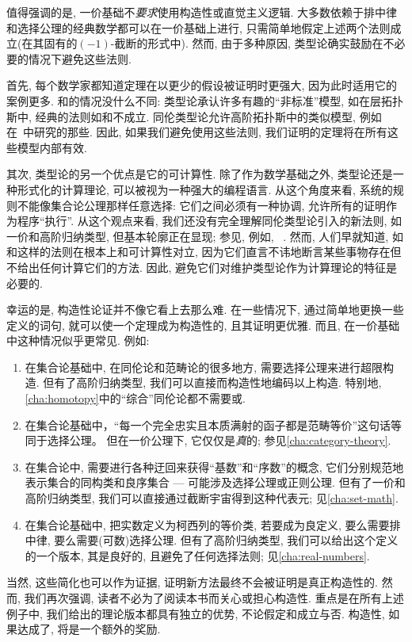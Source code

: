 值得强调的是, 一价基础不\emph{要求}使用构造性或直觉主义逻辑.  %
大多数依赖于排中律和选择公理的经典数学都可以在一价基础上进行, 只需简单地假定上述两个法则成立(在其固有的$(-1)$-截断的形式中). 
然而, 由于多种原因, 类型论确实鼓励在不必要的情况下避免这些法则. 

首先, 每个数学家都知道定理在以更少的假设被证明时更强大, 因为此时适用它的案例更多.
\choice{}和\LEM{}的情况没什么不同:
类型论承认许多有趣的``非标准''模型, 如在层拓扑斯中, 经典的法则如\choice{}和\LEM{}不成立.  
同伦类型论允许高阶拓扑斯中的类似模型, 例如在~\cite{ToenVezzosi02,Rezk05,lurie:higher-topoi}中研究的那些. 
因此, 如果我们避免使用这些法则, 我们证明的定理将在所有这些模型内部有效. 

其次, 类型论的另一个优点是它的可计算性. 
除了作为数学基础之外, 类型论还是一种形式化的计算理论, 可以被视为一种强大的编程语言. 
%
从这个角度来看, 系统的规则不能像集合论公理那样任意选择: 它们之间必须有一种协调, 允许所有的证明作为程序``执行''. 
从这个观点来看, 我们还没有完全理解同伦类型论引入的新法则, 如一价和高阶归纳类型, 但基本轮廓正在显现; 参见, 例如, ~\cite{lh:canonicity}.
然而, 人们早就知道, 如\choice{}和\LEM{}这样的法则在根本上和可计算性对立, 因为它们直言不讳地断言某些事物存在但不给出任何计算它们的方法. 
因此, 避免它们对维护类型论作为计算理论的特征是必要的. 

幸运的是, 构造性论证并不像它看上去那么难. 
在一些情况下, 通过简单地更换一些定义的词句, 就可以使一个定理成为构造性的, 且其证明更优雅. 
而且, 在一价基础中这种情况似乎更常见. 
例如: 
\begin{enumerate}
\item 在集合论基础中, 在同伦论和范畴论的很多地方, 需要选择公理来进行超限构造. 
      但有了高阶归纳类型, 我们可以直接而构造性地编码以上构造.
      特别地, \cref{cha:homotopy}中的``综合''同伦论都不需要\LEM{}或\choice{}.
\item 在集合论基础中，“每一个完全忠实且本质满射的函子都是范畴等价”这句话等同于选择公理。
      但在一价公理下, 它仅仅是\emph{真}的; 参见\cref{cha:category-theory}.
\item 在集合论中, 需要进行各种迂回来获得``基数''和``序数''的概念, 它们分别规范地表示集合的同构类和良序集合 --- 可能涉及选择公理或正则公理. 
      但有了一价和高阶归纳类型, 我们可以直接通过截断宇宙得到这种代表元; 见\cref{cha:set-math}. 
\item 在集合论基础中, 把实数定义为柯西列的等价类, 若要成为良定义, 要么需要排中律, 要么需要(可数)选择公理. 但有了高阶归纳类型, 我们可以给出这个定义的一个版本, 其是良好的, 且避免了任何选择法则; 见\cref{cha:real-numbers}. 
\end{enumerate}
当然, 这些简化也可以作为证据, 证明新方法最终不会被证明是真正构造性的. 然而, 我们再次强调, 读者不必为了阅读本书而关心或担心构造性. 重点是在所有上述例子中, 我们给出的理论版本都具有独立的优势, 不论假定\LEM{}和\choice{}成立与否. 构造性, 如果达成了, 将是一个额外的奖励. %

